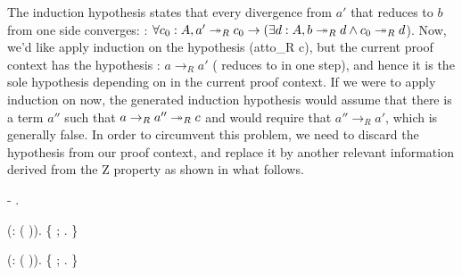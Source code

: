         The induction hypothesis states that every divergence from
        $a'$ that reduces to $b$ from one side converges: 
        : $\forall c_0 : A, a'\twoheadrightarrow_R c_0 \to (\exists d : A, b\twoheadrightarrow_R d
        \land c_0\twoheadrightarrow_R d$). Now, we'd like apply induction on the
        hypothesis  (atto\_R c), but the current proof context has the
        hypothesis : $a\to_R a'$ ( reduces to  in one step),
        and hence it is the sole hypothesis depending on  in the
        current proof context. If we were to apply induction on  now, 
        the generated induction hypothesis  would assume that there is 
        a term $a''$ such that $a \to_R a'' \twoheadrightarrow_R c$ and would require that 
        $a'' \to_R a'$, which is generally false. In order to circumvent 
        this problem, we need to discard the hypothesis  from our proof 
        context, and replace it by another relevant information derived from 
        the Z property as shown in what follows. \begin{coqdoccode}
\coqdocemptyline
\coqdocindent{1.00em}
-   . \end{coqdoccode}
 \begin{coqdoccode}
\coqdocemptyline
\coqdocindent{2.00em}
 (:    ( )).\coqdoceol
\coqdocindent{2.00em}
\{  ; . \} \end{coqdoccode}
 \begin{coqdoccode}
\coqdocnoindent
\coqdoceol
\coqdocindent{2.00em}
 (:    ( )).\coqdoceol
\coqdocindent{2.00em}
\{    ; . \} \end{coqdoccode}
